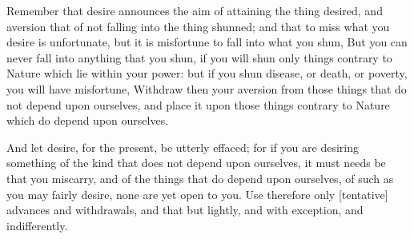 Remember that  desire announces  the aim  of attaining  the thing  desired, and
aversion that of not falling into the  thing shunned; and that to miss what you
desire is unfortunate, but it is misfortune to fall into what you shun, But you
can  never fall  into anything  that you  shun, if  you will  shun only  things
contrary to  Nature which lie  within your power: but  if you shun  disease, or
death, or poverty,  you will have misfortune, Withdraw then  your aversion from
those things that do not depend upon  ourselves, and place it upon those things
contrary to Nature which do depend upon ourselves.

And let desire,  for the present, be  utterly effaced; for if  you are desiring
something of  the kind that  does not depend upon  ourselves, it must  needs be
that you miscarry, and of the things  that do depend upon ourselves, of such as
you may fairly desire, none are yet open to you. Use therefore only [tentative]
advances  and  withdrawals, and  that  but  lightly,  and with  exception,  and
indifferently.
